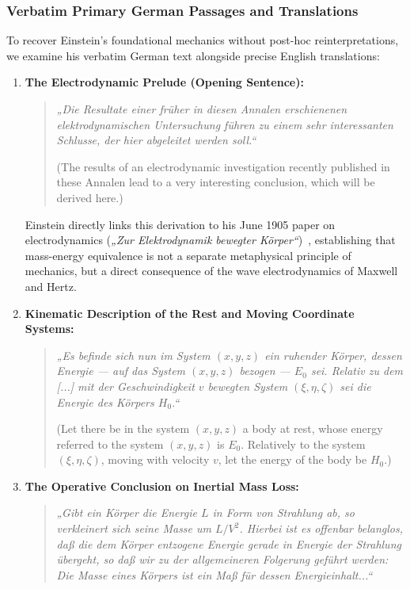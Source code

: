 \documentclass[11pt,a4paper]{article}
\begin{document}
\subsubsection{Verbatim Primary German Passages and Translations}
\label{subsubsec:german_passages}

To recover Einstein's foundational mechanics without post-hoc reinterpretations, we examine his verbatim German text alongside precise English translations:

\begin{enumerate}
    \item \textbf{The Electrodynamic Prelude (Opening Sentence):}
    \begin{quote}
    \textit{„Die Resultate einer früher in diesen Annalen erschienenen elektrodynamischen Untersuchung führen zu einem sehr interessanten Schlusse, der hier abgeleitet werden soll.“}
    
    (The results of an electrodynamic investigation recently published in these Annalen lead to a very interesting conclusion, which will be derived here.)
    \end{quote}
    Einstein directly links this derivation to his June 1905 paper on electrodynamics (\textit{„Zur Elektrodynamik bewegter Körper“})~\cite{Einstein1905a}, establishing that mass-energy equivalence is not a separate metaphysical principle of mechanics, but a direct consequence of the wave electrodynamics of Maxwell and Hertz.

    \item \textbf{Kinematic Description of the Rest and Moving Coordinate Systems:}
    \begin{quote}
    \textit{„Es befinde sich nun im System $(x, y, z)$ ein ruhender Körper, dessen Energie --- auf das System $(x, y, z)$ bezogen --- $E_0$ sei. Relativ zu dem [...] mit der Geschwindigkeit $v$ bewegten System $(\xi, \eta, \zeta)$ sei die Energie des Körpers $H_0$.“}
    
    (Let there be in the system $(x, y, z)$ a body at rest, whose energy referred to the system $(x, y, z)$ is $E_0$. Relatively to the system $(\xi, \eta, \zeta)$, moving with velocity $v$, let the energy of the body be $H_0$.)
    \end{quote}

    \item \textbf{The Operative Conclusion on Inertial Mass Loss:}
    \begin{quote}
    \textit{„Gibt ein Körper die Energie $L$ in Form von Strahlung ab, so verkleinert sich seine Masse um $L/V^2$. Hierbei ist es offenbar belanglos, daß die dem Körper entzogene Energie gerade in Energie der Strahlung übergeht, so daß wir zu der allgemeineren Folgerung geführt werden: Die Masse eines Körpers ist ein Maß für dessen Energieinhalt...“}
    

\end{quote}
\end{enumerate}
\end{document}
